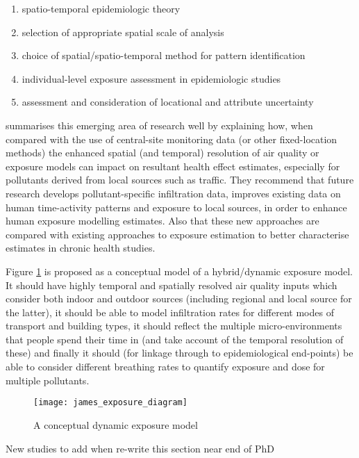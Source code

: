 \begin{enumerate}
  \item spatio-temporal epidemiologic theory
  \item selection of appropriate spatial scale of analysis
  \item choice of spatial/spatio-temporal method for pattern identification
  \item individual-level exposure assessment in epidemiologic studies
  \item assessment and consideration of locational and attribute uncertainty
\end{enumerate}

\cite{Baxter2013} summarises this emerging area of research well by explaining how, when compared with the use of central-site monitoring data (or other fixed-location methods) the enhanced spatial (and temporal) resolution of air quality or exposure models can impact on resultant health effect estimates, especially for pollutants derived from local sources such as traffic.  They recommend that future research develops pollutant-specific infiltration data, improves existing data on human time-activity patterns and exposure to local sources, in order to enhance human exposure modelling estimates. Also that these new approaches are compared with existing approaches to exposure estimation to better characterise estimates in chronic health studies.

\vspace{1cm}
Figure \ref{fig:james_exposure_diagram} is proposed as a conceptual model of a hybrid/dynamic exposure model. It should have highly temporal and spatially resolved air quality inputs which consider both indoor and outdoor sources (including regional and local source for the latter), it should be able to model infiltration rates for different modes of transport and building types, it should reflect the multiple micro-environments that people spend their time in (and take account of the temporal resolution of these) and finally it should (for linkage through to epidemiological end-points) be able to consider different breathing rates to quantify exposure and dose for multiple pollutants.

\begin{figure}[H]
\centering
\texttt{[image: james\_exposure\_diagram]}
\caption{A conceptual dynamic exposure model}
\label{fig:james_exposure_diagram}
\end{figure}

New studies to add when re-write this section near end of PhD
\cite{Su2015}

\cite{Schwartz2007}

\cite{Di2017}